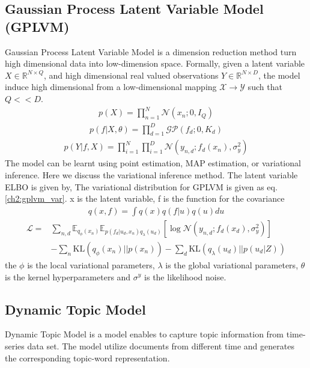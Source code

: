 \subsection{Gaussian Process Latent Variable Model (GPLVM)}
Gaussian Process Latent Variable Model \cite{lawrence_gaussian_nodate,titsias_bayesian_nodate} is a dimension reduction method turn high dimensional data into low-dimension space. Formally, given a latent variable $ X\in\mathbb{R}^{N\times Q} $, and high dimensional real valued observations $ Y\in\mathbb{R}^{N\times D} $, the model induce high dimensional from a low-dimensional mapping $ \mathcal{X}\rightarrow\mathcal{Y} $ such that $ Q<<D $.
\begin{align*}
p(X)=\prod_{n=1}^{N}\mathcal{N}(x_n;0,I_Q)
\end{align*}
\begin{align*}
p(f|X,\theta)=\prod_{d=1}^{D}\mathcal{GP}(f_d;0,K_d)
\end{align*}
\begin{align*}
p(Y|f,X)=\prod_{i=1}^{N}\prod_{i=1}^{D}\mathcal{N}(y_{n,d};f_d(x_n),\sigma_y^2)
\end{align*}
The model can be learnt using point estimation, MAP estimation, or variational inference. Here we discuss the variational inference method. The latent variable ELBO is given by,
The variational distribution for GPLVM is given as eq. \ref{ch2:gplvm_var}. x is the latent variable, f is the function for the covariance 
\begin{align}\label{ch2:gplvm_var}
q(x,f)=\int q(x)q(f|u)q(u)du
\end{align}
\begin{align*}
\mathcal{L}=&\sum_{n,d}\mathbb{E}_{q_\phi(x_n)}\mathbb{E}_{p(f_d|u_d,x_n)q_{\lambda}(u_d)}\left[\log\mathcal{N}(y_{n,d};f_d(x_d),\sigma_y^2)\right]\\
&-\sum_{n}\text{KL}(q_{\phi}(x_n)||p(x_n))-\sum_{d}\text{KL}(q_\lambda(u_d)||p(u_d|Z))
\end{align*}
the $ \phi $ is the local variational parameters, $ \lambda $ is the global variational parameters, $ \theta $ is the kernel hyperparameters and $ \sigma^y $ is the likelihood noise.
\subsection{Dynamic Topic Model}
Dynamic Topic Model \cite{blei_dynamic_2006} is a model enables to capture topic information from time-series data set. The model utilize documents from different time and generates the corresponding topic-word representation.

